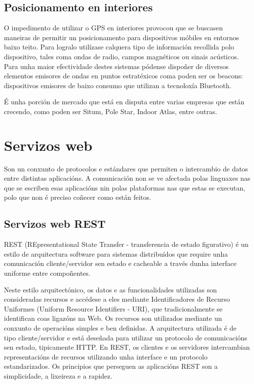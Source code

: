 \subsection{Posicionamento en interiores}

O impedimento de utilizar o GPS en interiores provocou que se buscasen maneiras de permitir un posicionamento para dispositivos móbiles en entornos baixo teito. Para logralo utilízase calquera tipo de información recollida polo dispositivo, tales coma ondas de radio, campos magnéticos ou sinais acústicos. Para unha maior efectividade destes sistemas pódense dispoñer de diversos elementos emisores de ondas en puntos estratéxicos coma poden ser os beacons: dispositivos emisores de baixo consumo que utilizan a tecnoloxía Bluetooth.

É unha porción de mercado que está en disputa entre varias empresas que están crecendo, como poden ser Situm, Pole Star, Indoor Atlas, entre outras.

\section{Servizos web}

Son un conxunto de protocolos e estándares que permiten o intercambio de datos entre distintas aplicacións. A comunicación non se ve afectada polas linguaxes nas que se escriben esas aplicacións nin polas plataformas nas que estas se executan, polo que non é preciso coñecer como están feitos.

\subsection{Servizos web REST}

REST (REpresentational State Transfer - transferencia de estado figurativo) é un estilo de arquitectura software para sistemas distribuídos que require unha comunicación cliente/servidor sen estado e cacheable a través dunha interface uniforme entre compoñentes.

Neste estilo arquitectónico, os datos e as funcionalidades utilizadas son consideradas recursos e accédese a eles mediante Identificadores de Recurso Uniformes (Uniform Resource Identifiers - URI), que tradicionalmente se identifican coas ligazóns na Web. Os recursos son utilizados mediante un conxunto de operacións simples e ben definidas. A arquitectura utilizada é de tipo cliente/servidor e está deseñada para utilizar un protocolo de comunicacións sen estado, tipicamente HTTP. En REST, os clientes e os servidores intercambian representacións de recursos utilizando unha interface e un protocolo estandarizados. Os principios que perseguen as aplicacións REST son a simplicidade, a lixeireza e a rapidez.